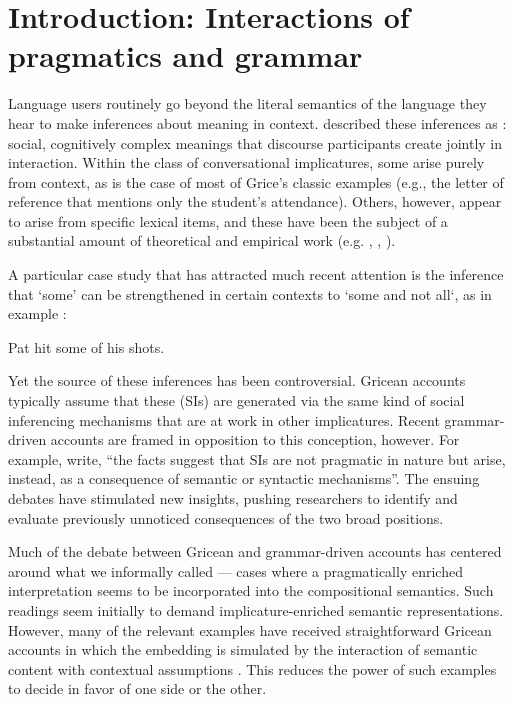 \documentclass[leqno,12pt]{article}
\begin{document}

\section{Introduction: Interactions of pragmatics and grammar}\label{sec:introduction}

Language users routinely go beyond the literal semantics of the language
they hear to make inferences about meaning in context. \citet{Grice75}
described these inferences as : 
social, cognitively complex meanings that discourse participants create
jointly in interaction. Within the class of conversational
implicatures, some arise purely from context, as is the case of most
of Grice's classic examples (e.g., the letter of reference that
mentions only the student's attendance). Others, however, appear to
arise from specific lexical items, and these have been the subject of
a substantial amount of theoretical and empirical work
(e.g. \citealt{Levinson00}, \citealt{Noveck00},
\citealt{ChierchiaFoxSpector08}). 

A particular case study that has attracted much recent attention is
the inference that `some' can be strengthened in certain contexts to
`some and not all`, as in example :

\begin{examples}
\item\label{some1} Pat hit some of his shots.
\end{examples}

\noindent Yet the source of these inferences has been
controversial. Gricean accounts typically assume that these
 (SIs) are generated via the same kind of
social inferencing mechanisms that are at work in other implicatures. 
Recent grammar-driven accounts are framed in
opposition to this conception, however.
For example,  write, ``the facts
suggest that SIs are not pragmatic in nature but
arise, instead, as a consequence of semantic or syntactic
mechanisms''. The ensuing debates have stimulated new insights,
pushing researchers to identify and evaluate previously unnoticed
consequences of the two broad positions.

Much of the debate between Gricean and grammar-driven accounts has
centered around what we informally called 
--- cases where a pragmatically enriched interpretation seems to be
incorporated into the compositional semantics. Such readings seem
initially to demand implicature-enriched semantic representations.
However, many of the relevant examples have received straightforward
Gricean accounts in which the embedding is simulated by the
interaction of semantic content with contextual assumptions
\citep{Russell06,Geurts09}. This reduces the power of such examples to
decide in favor of one side or the other.
\end{document}

